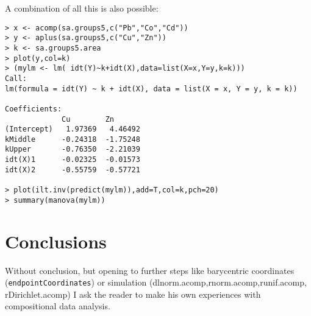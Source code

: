 \documentclass{article}
\newcommand{\code}[1]{{\tt #1}}
\begin{document}
A combination of all this is also possible:
\begin{verbatim}
> x <- acomp(sa.groups5,c("Pb","Co","Cd"))
> y <- aplus(sa.groups5,c("Cu","Zn"))
> k <- sa.groups5.area
> plot(y,col=k)
> (mylm <- lm( idt(Y)~k+idt(X),data=list(X=x,Y=y,k=k)))
Call:
lm(formula = idt(Y) ~ k + idt(X), data = list(X = x, Y = y, k = k))

Coefficients:
             Cu        Zn      
(Intercept)   1.97369   4.46492
kMiddle      -0.24318  -1.75248
kUpper       -0.76350  -2.21039
idt(X)1      -0.02325  -0.01573
idt(X)2      -0.55759  -0.57721

> plot(ilt.inv(predict(mylm)),add=T,col=k,pch=20)
> summary(manova(mylm))
\end{verbatim}

\section{Conclusions}
Without conclusion, but opening to further steps like barycentric coordinates
(\code{endpointCoordinates}) or simulation
(dlnorm.acomp,rnorm.acomp,runif.acomp, rDirichlet.acomp) I ask the reader to
make his own experiences with compositional data analysis.
\end{document}
